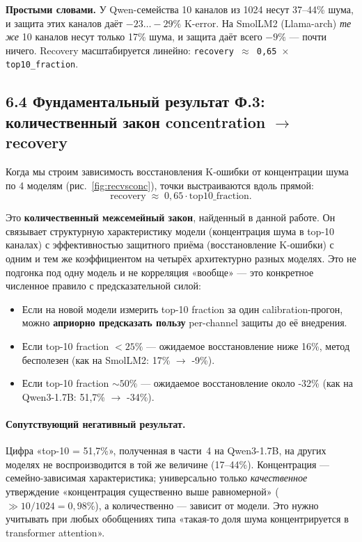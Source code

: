 \documentclass[a4paper,12pt]{article}
\begin{document}
\textbf{Простыми словами.} У Qwen-семейства 10 каналов из 1024 несут
37--44\% шума, и защита этих каналов даёт $-23\ldots -29\%$ K-error.
На SmolLM2 (Llama-arch) \textit{те же} 10 каналов несут только 17\%
шума, и защита даёт всего $-9\%$ --- почти ничего. Recovery
масштабируется линейно: \texttt{recovery $\approx$ 0,65 $\times$
top10\_fraction}.

\subsection*{6.4 Фундаментальный результат Ф.3: количественный закон concentration $\to$ recovery}

Когда мы строим зависимость восстановления K-ошибки от концентрации
шума по 4 моделям (рис.~\ref{fig:recvsconc}), точки выстраиваются вдоль
прямой:
\[
\text{recovery} \;\approx\; 0{,}65 \cdot \text{top10\_fraction}.
\]

Это \textbf{количественный межсемейный закон}, найденный в данной
работе. Он связывает структурную характеристику модели (концентрация
шума в top-10 каналах) с эффективностью защитного приёма (восстановление
K-ошибки) с одним и тем же коэффициентом на четырёх архитектурно разных
моделях. Это не подгонка под одну модель и не корреляция «вообще» ---
это конкретное численное правило с предсказательной силой:

\begin{itemize}[leftmargin=*]
\item Если на новой модели измерить top-10 fraction за один
  calibration-прогон, можно \textbf{априорно предсказать пользу}
  per-channel защиты до её внедрения.
\item Если top-10 fraction $< 25\%$ --- ожидаемое восстановление ниже
  16\%, метод бесполезен (как на SmolLM2: 17\% $\to$ -9\%).
\item Если top-10 fraction $\sim 50\%$ --- ожидаемое восстановление
  около -32\% (как на Qwen3-1.7B: 51,7\% $\to$ -34\%).
\end{itemize}

\paragraph{Сопутствующий негативный результат.} Цифра «top-10 = 51,7\%»,
полученная в части~4 на Qwen3-1.7B, на других моделях не воспроизводится
в той же величине (17--44\%). Концентрация --- семейно-зависимая
характеристика; универсально только \textit{качественное} утверждение
«концентрация существенно выше равномерной» (\(\gg 10/1024 = 0{,}98\%\)),
а количественно --- зависит от модели. Это нужно учитывать при любых
обобщениях типа «такая-то доля шума концентрируется в transformer
attention».
\end{document}
